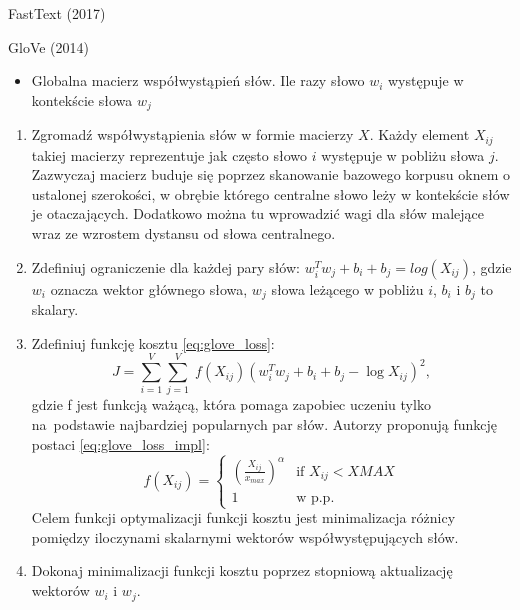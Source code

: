 \documentclass{beamer}
\begin{document}
	\begin{frame}{FastText (2017)}
		
	\end{frame}
	\begin{frame}{GloVe (2014)}
		\begin{itemize}
			\item Globalna macierz współwystąpień słów.
			Ile razy słowo $w_i$ występuje w kontekście słowa $w_j$
			
		\end{itemize}



\begin{enumerate}
	\item Zgromadź współwystąpienia słów w formie macierzy $X$. Każdy element $X_{ij}$ takiej macierzy reprezentuje jak często słowo $i$ występuje w pobliżu słowa $j$. Zazwyczaj macierz buduje się poprzez skanowanie bazowego korpusu oknem o ustalonej szerokości, w obrębie którego centralne słowo leży w kontekście słów je otaczających. Dodatkowo można tu wprowadzić wagi dla słów malejące wraz ze wzrostem dystansu od słowa centralnego.
	\item Zdefiniuj ograniczenie dla każdej pary słów: $w_i^Tw_j + b_i + b_j = log(X_{ij})$, gdzie $w_i$ oznacza wektor głównego słowa, $w_j$ słowa leżącego w pobliżu $i$, $b_i$ i $b_j$ to skalary.
	\item Zdefiniuj funkcję kosztu \ref{eq:glove_loss}:
	\begin{equation}
	\label{eq:glove_loss}
	J = \sum_{i=1}^V \sum_{j=1}^V \; f(X_{ij}) ( w_i^T w_j + b_i + b_j - \log X_{ij})^2,
	\end{equation}
	gdzie f jest funkcją ważącą, która pomaga zapobiec uczeniu tylko na~podstawie najbardziej popularnych par słów. Autorzy proponują funkcję postaci \ref{eq:glove_loss_impl}:
	\begin{equation}
	\label{eq:glove_loss_impl}
	f(X_{ij}) = 
	\begin{cases}
	(\frac{X_{ij}}{x_{max}})^\alpha & \text{if } X_{ij} < XMAX \\
	1 & \text{w p.p.}
	\end{cases}
	\end{equation}
	Celem funkcji optymalizacji funkcji	 kosztu jest minimalizacja różnicy pomiędzy iloczynami skalarnymi wektorów współwystępujących słów.
	\item Dokonaj minimalizacji funkcji kosztu poprzez stopniową aktualizację wektorów $w_i$ i $w_j$.
\end{enumerate}
	\end{frame}
\end{document}

